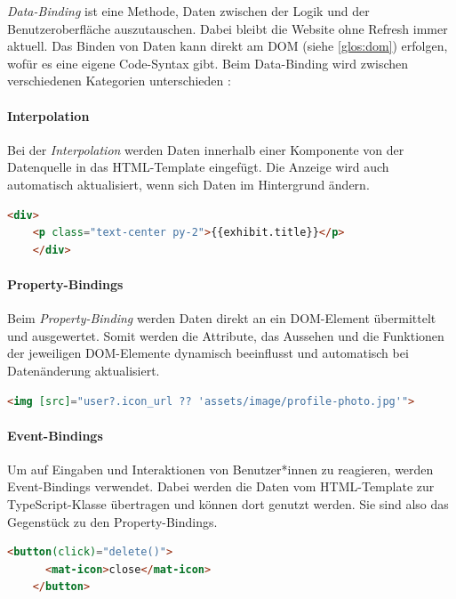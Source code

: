 \emph{Data-Binding} ist eine Methode, Daten zwischen der Logik und der Benutzeroberfläche auszutauschen. Dabei bleibt die Website ohne Refresh immer aktuell. Das Binden von Daten kann direkt am DOM (siehe \ref{glos:dom}) erfolgen, wofür es eine eigene Code-Syntax gibt. Beim Data-Binding wird zwischen  verschiedenen Kategorien unterschieden \cite{AngularBuch} \cite{BindingSyntax}:  
    

\paragraph{Interpolation}
Bei der \emph{Interpolation} werden Daten innerhalb einer Komponente von der Datenquelle in das HTML-Template eingefügt. Die Anzeige wird auch automatisch aktualisiert, wenn sich Daten im Hintergrund ändern. \cite{BindingSyntax}

\begin{lstlisting}[caption={{Beispiel für Interpolation in der 3D-Gallery}},language=HTML,label=lst:impl:interpolation]
    <div>
    <p class="text-center py-2">{{exhibit.title}}</p>
    </div>
\end{lstlisting}

\paragraph{Property-Bindings}
Beim \emph{Property-Binding} werden Daten direkt an ein DOM-Element übermittelt und ausgewertet. Somit werden die Attribute, das Aussehen und die Funktionen der jeweiligen DOM-Elemente dynamisch beeinflusst und automatisch bei Datenänderung aktualisiert. \cite{AngularPropertyBinding}
\begin{lstlisting}[caption={{Beispiel für Property-Bindings in der 3D-Gallery}},language=HTML,label=lst:impl:property-binding]
    <img [src]="user?.icon_url ?? 'assets/image/profile-photo.jpg'">
\end{lstlisting}

\paragraph{Event-Bindings}
Um auf Eingaben und Interaktionen von Benutzer*innen zu reagieren, werden Event-Bindings verwendet. Dabei werden die Daten vom HTML-Template zur TypeScript-Klasse übertragen und können dort genutzt werden. Sie sind also das Gegenstück zu den Property-Bindings. \cite{AngularEventBinding}
\begin{lstlisting}[caption={{Beispiel für Event-Bindings in der 3D-Gallery}},language=HTML,label=lst:impl:event-binding]
    <button(click)="delete()">
      <mat-icon>close</mat-icon>
    </button>
\end{lstlisting}

